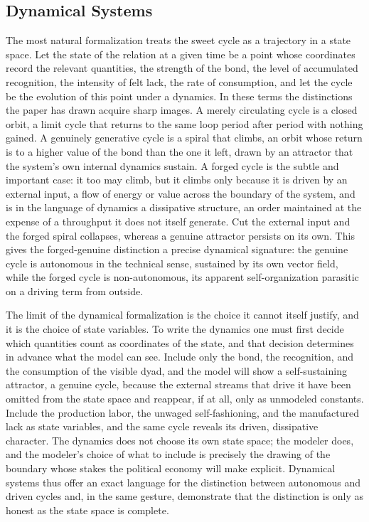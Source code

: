 \subsection{Dynamical Systems}

The most natural formalization treats the sweet cycle as a trajectory in a state space. Let the state of the relation at a given time be a point whose coordinates record the relevant quantities, the strength of the bond, the level of accumulated recognition, the intensity of felt lack, the rate of consumption, and let the cycle be the evolution of this point under a dynamics. In these terms the distinctions the paper has drawn acquire sharp images. A merely circulating cycle is a closed orbit, a limit cycle that returns to the same loop period after period with nothing gained. A genuinely generative cycle is a spiral that climbs, an orbit whose return is to a higher value of the bond than the one it left, drawn by an attractor that the system's own internal dynamics sustain. A forged cycle is the subtle and important case: it too may climb, but it climbs only because it is driven by an external input, a flow of energy or value across the boundary of the system, and is in the language of dynamics a dissipative structure, an order maintained at the expense of a throughput it does not itself generate. Cut the external input and the forged spiral collapses, whereas a genuine attractor persists on its own. This gives the forged-genuine distinction a precise dynamical signature: the genuine cycle is autonomous in the technical sense, sustained by its own vector field, while the forged cycle is non-autonomous, its apparent self-organization parasitic on a driving term from outside.

The limit of the dynamical formalization is the choice it cannot itself justify, and it is the choice of state variables. To write the dynamics one must first decide which quantities count as coordinates of the state, and that decision determines in advance what the model can see. Include only the bond, the recognition, and the consumption of the visible dyad, and the model will show a self-sustaining attractor, a genuine cycle, because the external streams that drive it have been omitted from the state space and reappear, if at all, only as unmodeled constants. Include the production labor, the unwaged self-fashioning, and the manufactured lack as state variables, and the same cycle reveals its driven, dissipative character. The dynamics does not choose its own state space; the modeler does, and the modeler's choice of what to include is precisely the drawing of the boundary whose stakes the political economy will make explicit. Dynamical systems thus offer an exact language for the distinction between autonomous and driven cycles and, in the same gesture, demonstrate that the distinction is only as honest as the state space is complete.

